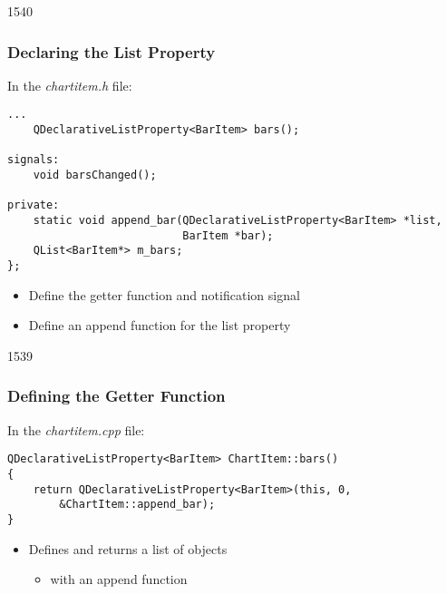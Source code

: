 \begin{slide}[fragile]{1540}\frametitle{Declaring the List Property}

In the \textit{chartitem.h} file:

\vspace*{0.5em}
\begin{lstlisting}
...
    QDeclarativeListProperty<BarItem> bars();

signals:
    void barsChanged();

private:
    static void append_bar(QDeclarativeListProperty<BarItem> *list,
                           BarItem *bar);
    QList<BarItem*> m_bars;
};
\end{lstlisting}

\vspace*{0.5em}
\begin{itemize}
\item Define the getter function and notification signal
\item Define an append function for the list property
\end{itemize}

\end{slide}

\begin{slide}[fragile]{1539}\frametitle{Defining the Getter Function}

In the \textit{chartitem.cpp} file:

\vspace*{0.5em}
\begin{lstlisting}
QDeclarativeListProperty<BarItem> ChartItem::bars()
{
    return QDeclarativeListProperty<BarItem>(this, 0,
        &ChartItem::append_bar);
}
\end{lstlisting}

\vspace*{0.5em}
\begin{itemize}
\item Defines and returns a list of  objects
  \begin{itemize}
  \item with an append function
  \end{itemize}
\end{itemize}

\end{slide}

